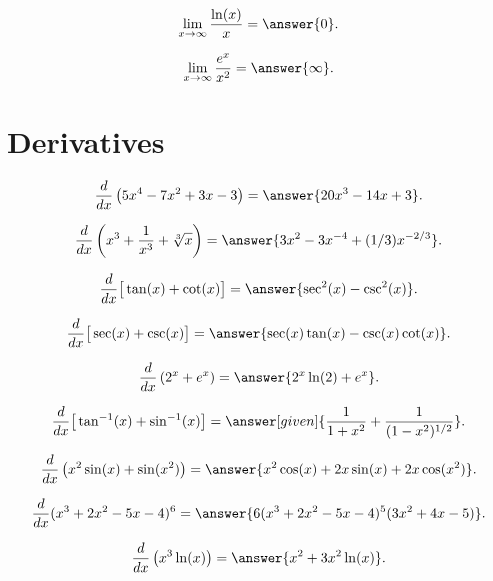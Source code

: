 \documentclass{ximera}
\begin{document}
\begin{problem}
\[\lim_{x \to \infty} \frac{\ln(x)}{x} = \answer{0}.\]

\[\lim_{x \to \infty} \frac{e^x}{x^2} = \answer{\infty}.\]
\end{problem}

\section{Derivatives}

\begin{problem}
\[\frac{d}{dx}\left(5x^4 - 7x^2 + 3x -3  \right) = \answer{20x^3 - 14x + 3}.\]
\end{problem}


\begin{problem}
\[\frac{d}{dx}\left(x^3 + \frac{1}{x^3} + \sqrt[3]x  \right) = \answer{3x^2 -3x^{-4} +(1/3)x^{-2/3}}.\]
\end{problem}


\begin{problem}
\[\frac{d}{dx}\big[\tan(x) + \cot(x)  \big] = \answer{\sec^2(x) - \csc^2(x)}.\]

\[\frac{d}{dx}\big[\sec(x) + \csc(x)  \big] = \answer{\sec(x)\tan(x) - \csc(x)\cot(x)}.\]
\end{problem}

\begin{problem}
\[\frac{d}{dx}\left(2^x + e^x  \right) = \answer{2^x \ln(2) + e^x}.\]
\end{problem}

\begin{problem}
\[\frac{d}{dx}\big[\tan^{-1}(x) + \sin^{-1}(x)  \big] = 
\answer[given]{\frac{1}{1+x^2} + \frac{1}{(1-x^2)^{1/2}}}.\]
\end{problem}

\begin{problem}
\[\frac{d}{dx}\left(x^2 \sin(x) + \sin(x^2) \right) = \answer{x^2\cos(x) + 2x\sin(x) + 2x\cos(x^2)}.\]
\end{problem}


\begin{problem}
\[\frac{d}{dx}(x^3 + 2x^2 - 5x - 4 )^6 = \answer{6(x^3 + 2x^2 - 5x - 4 )^5(3x^2 + 4x -5)}.\]
\end{problem}




\begin{problem}
\[\frac{d}{dx}\left(x^3 \ln(x) \right) = \answer{x^2 + 3x^2\ln(x)}.\]
\end{problem}
\end{document}
